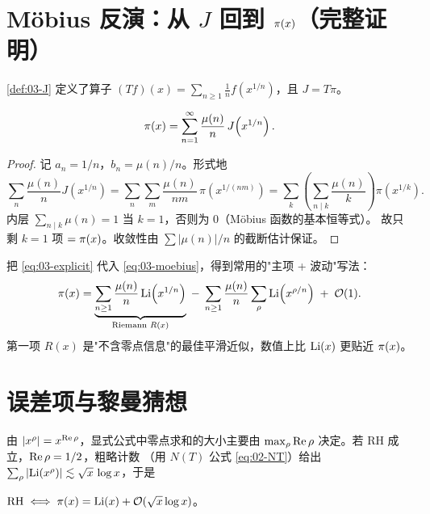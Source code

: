 \section{M\"obius 反演：从 $J$ 回到 $\pi(x)$（完整证明）}
\label{sec:03-moebius}

\cref{def:03-J} 定义了算子
$(Tf)(x)=\sum_{n\ge1}\frac1n f(x^{1/n})$，且 $J=T\pi$。

\begin{theorem}[M\"obius 反演]\label{thm:03-moebius}
\begin{equation}\label{eq:03-moebius}
  \pi(x)=\sum_{n=1}^{\infty}\frac{\mu(n)}{n}\,J\!\left(x^{1/n}\right).
\end{equation}
\end{theorem}

\begin{proof}
记 $a_n=1/n$，$b_n=\mu(n)/n$。形式地
\[
  \sum_{n}\frac{\mu(n)}{n}J(x^{1/n})
  =\sum_{n}\sum_{m}\frac{\mu(n)}{nm}\,\pi\!\left(x^{1/(nm)}\right)
  =\sum_{k}\left(\sum_{n\mid k}\frac{\mu(n)}{k}\right)\pi\!\left(x^{1/k}\right).
\]
内层 $\sum_{n\mid k}\mu(n)=1$ 当 $k=1$，否则为 $0$（M\"obius 函数的基本恒等式）。
故只剩 $k=1$ 项 $=\pi(x)$。收敛性由 $\sum|\mu(n)|/n$ 的截断估计保证。
\end{proof}

把 \cref{eq:03-explicit} 代入 \cref{eq:03-moebius}，得到常用的"主项 + 波动"写法：
\begin{equation}\label{eq:03-pi-approx}
  \pi(x)=\underbrace{\sum_{n\ge1}\frac{\mu(n)}{n}\operatorname{Li}\!\left(x^{1/n}\right)}_{\text{Riemann }R(x)}
  \;-\;\sum_{n\ge1}\frac{\mu(n)}{n}\sum_{\rho}\operatorname{Li}\!\left(x^{\rho/n}\right)
  \;+\;\mathcal{O}(1).
\end{equation}
第一项 $R(x)$ 是"不含零点信息"的最佳平滑近似，数值上比 $\operatorname{Li}(x)$ 更贴近 $\pi(x)$。

\section{误差项与黎曼猜想}
\label{sec:03-error}

由 $\left\lvert x^\rho\right\rvert=x^{\operatorname{Re}\rho}$，显式公式中零点求和的大小主要由
$\max_\rho\operatorname{Re}\rho$ 决定。若 RH 成立，$\operatorname{Re}\rho=1/2$，粗略计数
（用 $N(T)$ 公式 \cref{eq:02-NT}）给出
$\sum_\rho\left\lvert \operatorname{Li}(x^\rho)\right\rvert\lesssim\sqrt{x}\,\log x$，于是

\begin{theorem}\label{thm:03-vonkoch}
$\mathrm{RH}\iff\pi(x)=\operatorname{Li}(x)+\mathcal{O}\!\left(\sqrt{x}\log x\right)$。
\end{theorem}

